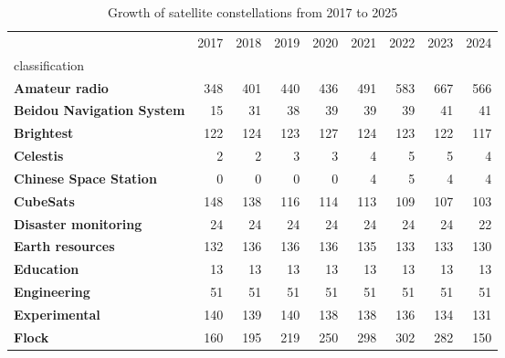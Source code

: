 \begin{table}
	\caption{Growth of satellite constellations from 2017 to 2025}
	\label{fig:satellite-constellations-short}
	\begin{tabular}{lrrrrrrrr}
		\toprule
		                                                       & 2017           & 2018 & 2019 & 2020 & 2021 & 2022 & 2023 & 2024       \\
		classification                                         &                &      &      &      &      &      &      &            \\
		\midrule
		\textbf{Amateur radio}                                 & 348            & 401  & 440  & 436  & 491  & 583  & 667  & 566        \\
		\textbf{Beidou Navigation System}                      & 15             & 31   & 38   & 39   & 39   & 39   & 41   & 41         \\
		\textbf{Brightest}                                     & 122            & 124  & 123  & 127  & 124  & 123  & 122  & 117        \\
		\textbf{Celestis}                                      & 2              & 2    & 3    & 3    & 4    & 5    & 5    & 4          \\
		\textbf{Chinese Space Station}                         & 0              & 0    & 0    & 0    & 4    & 5    & 4    & 4          \\
		\textbf{CubeSats}                                      & 148            & 138  & 116  & 114  & 113  & 109  & 107  & 103        \\
		\textbf{Disaster monitoring}                           & 24             & 24   & 24   & 24   & 24   & 24   & 24   & 22         \\
		\textbf{Earth resources}                               & 132            & 136  & 136  & 136  & 135  & 133  & 133  & 130        \\
		\textbf{Education}                                     & 13             & 13   & 13   & 13   & 13   & 13   & 13   & 13         \\
		\textbf{Engineering}                                   & 51             & 51   & 51   & 51   & 51   & 51   & 51   & 51         \\
		\textbf{Experimental}                                  & 140            & 139  & 140  & 138  & 138  & 136  & 134  & 131        \\
		\textbf{Flock}                                         & 160            & 195  & 219  & 250  & 298  & 302  & 282  & 150        \\

\end{tabular}
\end{table}
